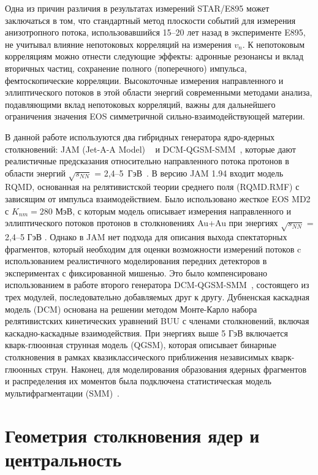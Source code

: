Одна из причин различия в результатах измерений STAR/E895 может заключаться в том, что стандартный метод плоскости событий для измерения анизотропного потока, использовавшийся 15--20 лет назад в эксперименте E895, не учитывал влияние непотоковых корреляций  на измерения $v_n$. 
К непотоковым корреляциям можно отнести следующие эффекты: адронные резонансы и вклад вторичных частиц, сохранение полного (поперечного) импульса, фемтоскопические корреляции. 
Высокоточные измерения направленного и эллиптического потоков в этой области энергий современными методами анализа, подавляющими вклад непотоковых корреляций, важны для дальнейшего ограничения значения EOS симметричной сильно-взаимодействующей материи.

В данной работе используются два гибридных генератора ядро-ядерных столкновений: JAM (Jet-A-A Model) ~\cite{Zhang:2018wlk, nara2019jam, Nara:2019qfd}  и  DCM-QGSM-SMM~\cite{Botvina:1994vj,Baznat:2019iom}, которые дают реалистичные предсказания относительно направленного потока протонов в области энергий $\sqrt{s_{NN}}$  = 2,4--5~ГэВ~\cite{Parfenov:2022brq}. 
В версию JAM 1.94 входит модель RQMD, основанная на релятивистской теории среднего поля (RQMD.RMF) с зависящим от импульса взаимодействием. 
Было использовано жесткое EOS MD2  с $K_{nm} = 280$ МэВ, с которым модель описывает измерения направленного и эллиптического потоков протонов в столкновениях Au+Au при энергиях $\sqrt{s_{NN}}$ = 2,4--5 ГэВ \cite{Nara:2019qfd, Parfenov:2022brq}. 
Однако в  JAM нет подхода  для описания выхода спектаторных фрагментов, который необходим для оценки возможности измерений потоков c использованием реалистичного моделирования передних детекторов  в экспериментах с фиксированной мишенью.
Это было компенсировано использованием в работе второго генератора DCM-QGSM-SMM~\cite{Botvina:1994vj,Baznat:2019iom}, состоящего  из трех модулей, последовательно добавляемых друг к другу.  
Дубненская каскадная модель (DCM)  основана на решении методом Монте-Карло набора релятивистских кинетических уравнений BUU с членами столкновений, 
включая каскадно-каскадные взаимодействия.  При энергиях выше 5 ГэВ  включается кварк-глюонная струнная модель (QGSM), которая описывает бинарные столкновения в рамках 
квазиклассического приближения независимых кварк-глюонных струн. Наконец, для моделирования образования ядерных фрагментов и распределения их моментов 
была подключена статистическая модель мультифрагментации  (SMM)~\cite{Botvina:1994vj,Baznat:2019iom}. 

\section{Геометрия столкновения ядер и центральность}
\label{theory:centrality}

